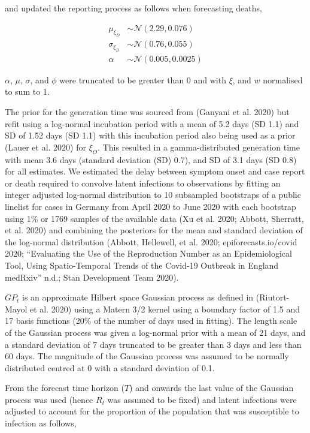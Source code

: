 and updated the reporting process as follows when forecasting deaths,

\begin{align}
    \mu_{\xi_{D}} &\sim \mathcal{N}(2.29, 0.076) \\
    \sigma_{\xi_{D}} &\sim \mathcal{N}(0.76, 0.055) \\
    \alpha &\sim \mathcal{N}(0.005, 0.0025) 
\end{align}

\(\alpha\), \(\mu\), \(\sigma\), and \(\phi\) were truncated to be greater than 0 and with \(\xi\), and \(w\) normalised to sum to 1.

The prior for the generation time was sourced from (Ganyani et al. 2020) but refit using a log-normal incubation period with a mean of 5.2 days (SD 1.1) and SD of 1.52 days (SD 1.1) with this incubation period also being used as a prior (Lauer et al. 2020) for \(\xi_{O}\). This resulted in a gamma-distributed generation time with mean 3.6 days (standard deviation (SD) 0.7), and SD of 3.1 days (SD 0.8) for all estimates. We estimated the delay between symptom onset and case report or death required to convolve latent infections to observations by fitting an integer adjusted log-normal distribution to 10 subsampled bootstraps of a public linelist for cases in Germany from April 2020 to June 2020 with each bootstrap using 1\% or 1769 samples of the available data (Xu et al. 2020; Abbott, Sherratt, et al. 2020) and combining the posteriors for the mean and standard deviation of the log-normal distribution (Abbott, Hellewell, et al. 2020; epiforecasts.io/covid 2020; {``Evaluating the Use of the Reproduction Number as an Epidemiological Tool, Using Spatio-Temporal Trends of the {Covid-19} Outbreak in {England} \textbar{} {medRxiv}''} n.d.; Stan Development Team 2020).

\(GP_t\) is an approximate Hilbert space Gaussian process as defined in (Riutort-Mayol et al. 2020) using a Matern 3/2 kernel using a boundary factor of 1.5 and 17 basis functions (20\% of the number of days used in fitting). The length scale of the Gaussian process was given a log-normal prior with a mean of 21 days, and a standard deviation of 7 days truncated to be greater than 3 days and less than 60 days. The magnitude of the Gaussian process was assumed to be normally distributed centred at 0 with a standard deviation of 0.1.

From the forecast time horizon (\(T\)) and onwards the last value of the Gaussian process was used (hence \(R_t\) was assumed to be fixed) and latent infections were adjusted to account for the proportion of the population that was susceptible to infection as follows,

